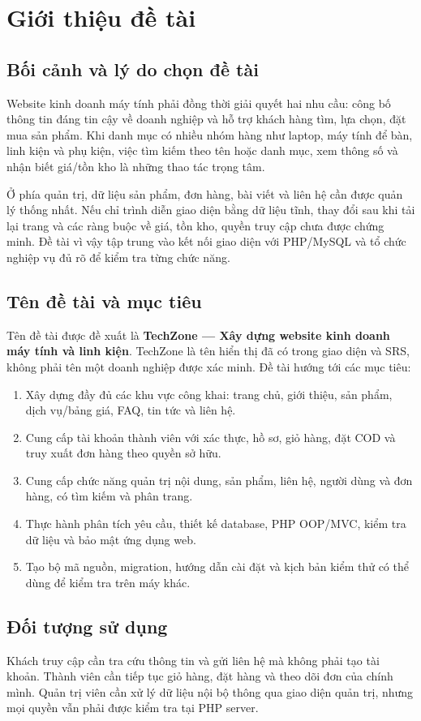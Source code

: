\section{Giới thiệu đề tài}
\label{sec:introduction}
\subsection{Bối cảnh và lý do chọn đề tài}
Website kinh doanh máy tính phải đồng thời giải quyết hai nhu cầu: công bố thông tin đáng tin cậy về doanh nghiệp và hỗ trợ khách hàng tìm, lựa chọn, đặt mua sản phẩm. Khi danh mục có nhiều nhóm hàng như laptop, máy tính để bàn, linh kiện và phụ kiện, việc tìm kiếm theo tên hoặc danh mục, xem thông số và nhận biết giá/tồn kho là những thao tác trọng tâm.

Ở phía quản trị, dữ liệu sản phẩm, đơn hàng, bài viết và liên hệ cần được quản lý thống nhất. Nếu chỉ trình diễn giao diện bằng dữ liệu tĩnh, thay đổi sau khi tải lại trang và các ràng buộc về giá, tồn kho, quyền truy cập chưa được chứng minh. Đề tài vì vậy tập trung vào kết nối giao diện với PHP/MySQL và tổ chức nghiệp vụ đủ rõ để kiểm tra từng chức năng.

\subsection{Tên đề tài và mục tiêu}
Tên đề tài được đề xuất là \textbf{TechZone — Xây dựng website kinh doanh máy tính và linh kiện}. TechZone là tên hiển thị đã có trong giao diện và SRS, không phải tên một doanh nghiệp được xác minh. Đề tài hướng tới các mục tiêu:
\begin{enumerate}
\item Xây dựng đầy đủ các khu vực công khai: trang chủ, giới thiệu, sản phẩm, dịch vụ/bảng giá, FAQ, tin tức và liên hệ.
\item Cung cấp tài khoản thành viên với xác thực, hồ sơ, giỏ hàng, đặt COD và truy xuất đơn hàng theo quyền sở hữu.
\item Cung cấp chức năng quản trị nội dung, sản phẩm, liên hệ, người dùng và đơn hàng, có tìm kiếm và phân trang.
\item Thực hành phân tích yêu cầu, thiết kế database, PHP OOP/MVC, kiểm tra dữ liệu và bảo mật ứng dụng web.
\item Tạo bộ mã nguồn, migration, hướng dẫn cài đặt và kịch bản kiểm thử có thể dùng để kiểm tra trên máy khác.
\end{enumerate}

\subsection{Đối tượng sử dụng}
Khách truy cập cần tra cứu thông tin và gửi liên hệ mà không phải tạo tài khoản. Thành viên cần tiếp tục giỏ hàng, đặt hàng và theo dõi đơn của chính mình. Quản trị viên cần xử lý dữ liệu nội bộ thông qua giao diện quản trị, nhưng mọi quyền vẫn phải được kiểm tra tại PHP server.

